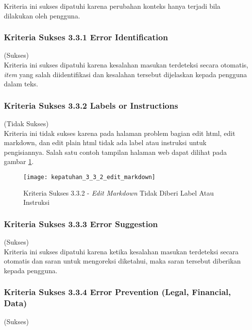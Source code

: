 Kriteria ini sukses dipatuhi karena perubahan konteks hanya terjadi bila dilakukan oleh pengguna.

\subsubsection{Kriteria Sukses 3.3.1 Error Identification}
\label{subsubsec:kepatuhan_kriteria_3.3.1}
(Sukses)\\

Kriteria ini sukses dipatuhi karena kesalahan masukan terdeteksi secara otomatis, \textit{item} yang salah diidentifikasi dan kesalahan tersebut dijelaskan kepada pengguna dalam teks.

\subsubsection{Kriteria Sukses 3.3.2 Labels or Instructions}
\label{subsubsec:kepatuhan_kriteria_3.3.2}
(Tidak Sukses) \\

Kriteria ini tidak sukses karena pada halaman problem bagian edit html, edit markdown, dan edit plain html tidak ada label atau instruksi untuk pengisiannya. Salah satu contoh tampilan halaman web dapat dilihat pada gambar \ref{fig:kepatuhan_3_3_2_edit_markdown}.
\begin{figure}[H]
	\centering  
	\texttt{[image: kepatuhan\_3\_3\_2\_edit\_markdown]}  
	\caption[Kriteria Sukses 3.3.2 - \textit{Edit Markdown} Tidak Diberi Label Atau Instruksi]{Kriteria Sukses 3.3.2 - \textit{Edit Markdown} Tidak Diberi Label Atau Instruksi} 
	\label{fig:kepatuhan_3_3_2_edit_markdown} 
\end{figure}

\subsubsection{Kriteria Sukses 3.3.3 Error Suggestion}
\label{subsubsec:kepatuhan_kriteria_3.3.3}
(Sukses) \\

Kriteria ini sukses dipatuhi karena ketika kesalahan masukan terdeteksi secara otomatis dan saran untuk mengoreksi diketahui, maka saran tersebut diberikan kepada pengguna.

\subsubsection{Kriteria Sukses 3.3.4 Error Prevention (Legal, Financial, Data)}
\label{subsubsec:kepatuhan_kriteria_3.3.4}
(Sukses) \\

